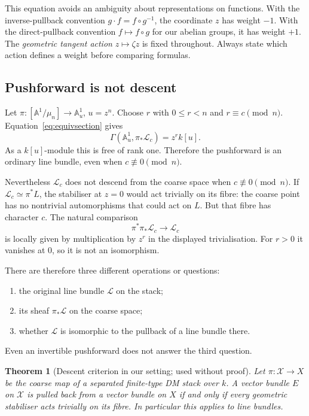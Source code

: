 \documentclass[11pt,a4paper]{article}
\numberwithin{equation}{section}
\newtheorem{theorem}[proposition]{Theorem}
\theoremstyle{definition}
\newcommand{\A}{\mathbb A}
\newcommand{\cX}{\mathcal X}
\newcommand{\cL}{\mathcal L}
\begin{document}
This equation avoids an ambiguity about representations on functions. With
the inverse-pullback convention $g\cdot f=f\circ g^{-1}$, the coordinate $z$
has weight $-1$. With the direct-pullback convention $f\mapsto f\circ g$ for
our abelian groups, it has weight $+1$. The \emph{geometric tangent action}
$z\mapsto\zeta z$ is fixed throughout. Always state which action defines a
weight before comparing formulas.

\subsection{Pushforward is not descent}
Let $\pi:[\A^1/\mu_n]\to\A^1_u$, $u=z^n$. Choose $r$ with
$0\leq r<n$ and $r\equiv c\pmod n$. Equation~\eqref{eq:equivsection} gives
\begin{equation}\label{eq:rankonepush}
 \Gamma(\A^1_u,\pi_*\cL_c)=z^r k[u].
\end{equation}
As a $k[u]$-module this is free of rank one. Therefore the pushforward is an
ordinary line bundle, even when $c\not\equiv0\pmod n$.

Nevertheless $\cL_c$ does not descend from the coarse space when
$c\not\equiv0\pmod n$.
If $\cL_c\simeq\pi^*L$, the stabiliser at $z=0$ would act trivially on its
fibre: the coarse point has no nontrivial automorphisms that could act on $L$.
But that fibre has character $c$. The natural comparison
\[
 \pi^*\pi_*\cL_c\longrightarrow\cL_c
\]
is locally given by multiplication by $z^r$ in the displayed trivialisation.
For $r>0$ it vanishes at $0$, so it is not an isomorphism.

There are therefore three different operations or questions:
\begin{enumerate}
\item the original line bundle $\cL$ on the stack;
\item its sheaf $\pi_*\cL$ on the coarse space;
\item whether $\cL$ is isomorphic to the pullback of a line bundle there.
\end{enumerate}
Even an invertible pushforward does not answer the third question.

\begin{theorem}[Descent criterion in our setting; used without proof]
Let $\pi:\cX\to X$ be the coarse map of a separated finite-type DM stack
over $k$. A vector bundle $E$ on $\cX$ is pulled back from a vector bundle
on $X$ if and only if every geometric stabiliser acts trivially on its fibre.
In particular this applies to line bundles.
\end{theorem}
\end{document}

